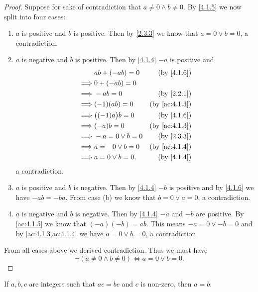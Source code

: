 \begin{proof}
  Suppose for sake of contradiction that \(a \neq 0 \land b \neq 0\).
  By \cref{4.1.5} we now split into four cases:
  \begin{enumerate}
    \item \(a\) is positive and \(b\) is positive.
          Then by \cref{2.3.3} we know that \(a = 0 \lor b = 0\), a contradiction.
    \item \(a\) is negative and \(b\) is positive.
          Then by \cref{4.1.4} \(-a\) is positive and
          \begin{align*}
                     & ab + (-ab) = 0       & \text{(by \cref{4.1.6})}    \\
            \implies & 0 + (-ab) = 0                                      \\
            \implies & -ab = 0              & \text{(by \cref{2.2.1})}    \\
            \implies & (-1)(ab) = 0         & \text{(by \cref{ac:4.1.3})} \\
            \implies & \big((-1)a\big)b = 0 & \text{(by \cref{4.1.6})}    \\
            \implies & (-a)b = 0            & \text{(by \cref{ac:4.1.3})} \\
            \implies & -a = 0 \lor b = 0    & \text{(by \cref{2.3.3})}    \\
            \implies & a = -0 \lor b = 0    & \text{(by \cref{ac:4.1.4})} \\
            \implies & a = 0 \lor b = 0,    & \text{(by \cref{4.1.4})}
          \end{align*}
          a contradiction.
    \item \(a\) is positive and \(b\) is negative.
          Then by \cref{4.1.4} \(-b\) is positive and by \cref{4.1.6} we have \(-ab = -ba\).
          From case (b) we know that \(b = 0 \lor a = 0\), a contradiction.
    \item \(a\) is negative and \(b\) is negative.
          Then by \cref{4.1.4} \(-a\) and \(-b\) are positive.
          By \cref{ac:4.1.5} we know that \((-a)(-b) = ab\).
          This means \(-a = 0 \lor -b = 0\) and by \cref{ac:4.1.3,ac:4.1.4} we have \(a = 0 \lor b = 0\), a contradiction.
  \end{enumerate}
  From all cases above we derived contradiction.
  Thus we must have
  \[
    \lnot(a \neq 0 \land b \neq 0) \iff a = 0 \lor b = 0.
  \]
\end{proof}

\begin{cor}\label{4.1.9}
  If \(a, b, c\) are integers such that \(ac = bc\) and \(c\) is non-zero, then \(a = b\).
\end{cor}

